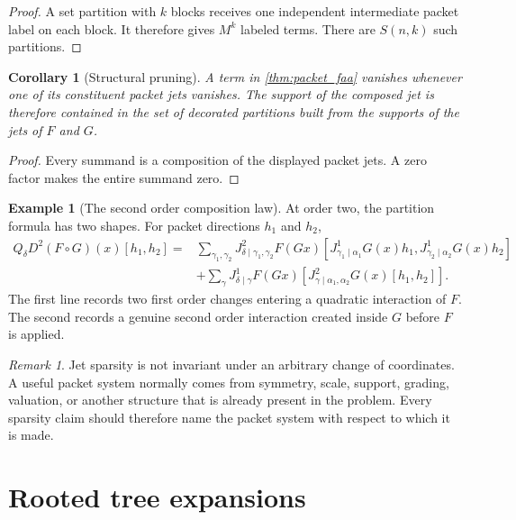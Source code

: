 \documentclass[11pt,a4paper]{article}
\theoremstyle{plain}
\newtheorem{corollary}[corollary]{Corollary}
\theoremstyle{definition}
\newtheorem{example}[example]{Example}
\theoremstyle{remark}
\newtheorem{remark}[remark]{Remark}
\begin{document}
\begin{proof}
A set partition with $k$ blocks receives one independent intermediate packet label on each block.  It therefore gives $M^k$ labeled terms.  There are $S(n,k)$ such partitions.
\end{proof}

\begin{corollary}[Structural pruning]\label{cor:structural_pruning}
A term in \cref{thm:packet_faa} vanishes whenever one of its constituent packet jets vanishes.  The support of the composed jet is therefore contained in the set of decorated partitions built from the supports of the jets of $F$ and $G$.
\end{corollary}

\begin{proof}
Every summand is a composition of the displayed packet jets.  A zero factor makes the entire summand zero.
\end{proof}


\begin{example}[The second order composition law]\label{ex:second_order_composition}
At order two, the partition formula has two shapes.  For packet directions $h_1$ and $h_2$,
\[
\begin{aligned}
Q_\delta D^2(F\circ G)(x)[h_1,h_2]
={}&
\sum_{\gamma_1,\gamma_2}
J^2_{\delta\mid\gamma_1,\gamma_2}F(Gx)
[J^1_{\gamma_1\mid\alpha_1}G(x)h_1,J^1_{\gamma_2\mid\alpha_2}G(x)h_2]\\
&+
\sum_\gamma
J^1_{\delta\mid\gamma}F(Gx)
[J^2_{\gamma\mid\alpha_1,\alpha_2}G(x)[h_1,h_2]].
\end{aligned}
\]
The first line records two first order changes entering a quadratic interaction of $F$.  The second records a genuine second order interaction created inside $G$ before $F$ is applied.
\end{example}

\begin{remark}\label{rem:jet_coordinate_dependence}
Jet sparsity is not invariant under an arbitrary change of coordinates.  A useful packet system normally comes from symmetry, scale, support, grading, valuation, or another structure that is already present in the problem.  Every sparsity claim should therefore name the packet system with respect to which it is made.
\end{remark}

\section{Rooted tree expansions}\label{sec:trees}
\end{document}
